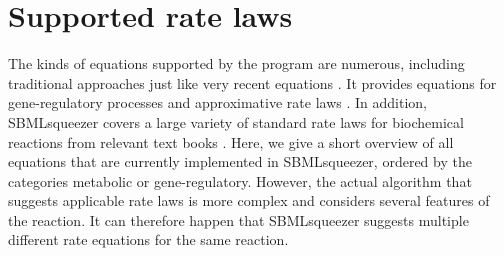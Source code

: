 \chapter{Supported rate laws}\label{chap:RateLaws}

The kinds of equations supported by the program are
numerous, including traditional approaches \citep{Guldberg1879, Michaelis1913}
just like very recent equations \citep{Liebermeister2006, Liebermeister2010}.
It provides equations for gene-regulatory processes
\citep{Hinze2007, Radde2007a, Toepfer2007, Vu2007,Weaver1999} and approximative
rate laws \citep{Savageau1969}.
In addition, SBMLsqueezer covers a large variety of standard rate laws for
biochemical reactions from relevant text books
\citep{Segel1993, Heinrich1996, Bisswanger2000, Cornish-Bowden2004}.
Here, we give a short overview of all equations that are currently implemented
in SBMLsqueezer, ordered by the categories metabolic or gene-regulatory.
However, the actual algorithm that suggests applicable rate laws is more complex
and considers several features of the reaction.
It can therefore happen that SBMLsqueezer suggests multiple different rate
equations for the same reaction.

